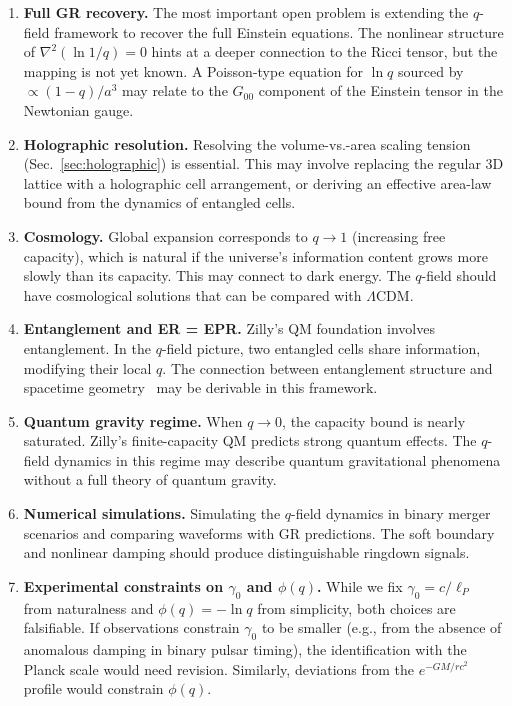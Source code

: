 \documentclass[aps,prd,twocolumn,showpacs,superscriptaddress,preprintnumbers]{revtex4-2}
\begin{document}
\begin{enumerate}
    \item \textbf{Full GR recovery.} The most important open problem is extending the $q$-field framework to recover the full Einstein equations. The nonlinear structure of $\nabla^2(\ln 1/q)=0$ hints at a deeper connection to the Ricci tensor, but the mapping is not yet known. A Poisson-type equation for $\ln q$ sourced by $\propto(1-q)/a^3$ may relate to the $G_{00}$ component of the Einstein tensor in the Newtonian gauge.

    \item \textbf{Holographic resolution.} Resolving the volume-vs.-area scaling tension (Sec.~\ref{sec:holographic}) is essential. This may involve replacing the regular 3D lattice with a holographic cell arrangement, or deriving an effective area-law bound from the dynamics of entangled cells.

    \item \textbf{Cosmology.} Global expansion corresponds to $q\to1$ (increasing free capacity), which is natural if the universe's information content grows more slowly than its capacity. This may connect to dark energy. The $q$-field should have cosmological solutions that can be compared with $\Lambda$CDM.

    \item \textbf{Entanglement and ER = EPR.} Zilly's QM foundation involves entanglement. In the $q$-field picture, two entangled cells share information, modifying their local $q$. The connection between entanglement structure and spacetime geometry~\cite{Maldacena:2013je} may be derivable in this framework.

    \item \textbf{Quantum gravity regime.} When $q\to0$, the capacity bound is nearly saturated. Zilly's finite-capacity QM predicts strong quantum effects. The $q$-field dynamics in this regime may describe quantum gravitational phenomena without a full theory of quantum gravity.

    \item \textbf{Numerical simulations.} Simulating the $q$-field dynamics in binary merger scenarios and comparing waveforms with GR predictions. The soft boundary and nonlinear damping should produce distinguishable ringdown signals.

    \item \textbf{Experimental constraints on $\gamma_0$ and $\phi(q)$.} While we fix $\gamma_0=c/\ell_P$ from naturalness and $\phi(q)=-\ln q$ from simplicity, both choices are falsifiable. If observations constrain $\gamma_0$ to be smaller (e.g., from the absence of anomalous damping in binary pulsar timing), the identification with the Planck scale would need revision. Similarly, deviations from the $e^{-GM/rc^2}$ profile would constrain $\phi(q)$.


\end{enumerate}
\end{document}
